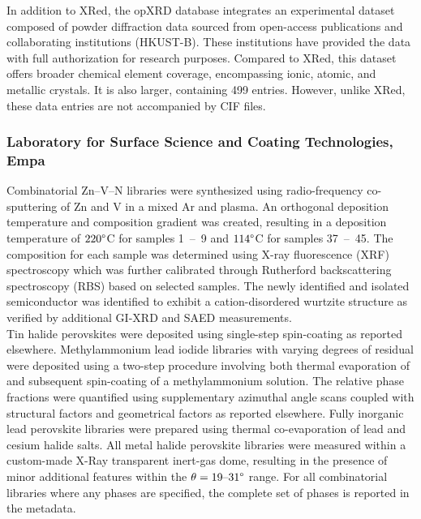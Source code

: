 In addition to XRed, the opXRD database integrates an experimental dataset composed of powder diffraction data sourced from open-access publications and collaborating institutions (HKUST-B). These institutions have provided the data with full authorization for research purposes. Compared to XRed, this dataset offers broader chemical element coverage, encompassing ionic, atomic, and metallic crystals. It is also larger, containing 499 entries. However, unlike XRed, these data entries are not accompanied by CIF files. \\


\subsubsection*{Laboratory for Surface Science and Coating Technologies, Empa}

Combinatorial Zn–V–N libraries were synthesized using radio-frequency co-sputtering of Zn and V in a mixed Ar and  plasma. An orthogonal deposition temperature and composition gradient was created, resulting in a deposition temperature of $220\degree$C for samples 1~–~9 and $114\degree$C for samples 37~–~45. The composition for each sample was determined using X-ray fluorescence (XRF) spectroscopy which was further calibrated through Rutherford backscattering spectroscopy (RBS) based on selected samples. The newly identified and isolated semiconductor  was identified to exhibit a cation-disordered wurtzite structure as verified by additional GI-XRD and SAED measurements\cite{Zhuk2021}. \\
Tin halide perovskites were deposited using single-step spin-coating as reported elsewhere\cite{Wieczorek2023}. Methylammonium lead iodide libraries with varying degrees of residual  were deposited using a two-step procedure involving both thermal evaporation of  and subsequent spin-coating of a methylammonium solution. The relative phase fractions were quantified using supplementary azimuthal angle scans coupled with structural factors and geometrical factors as reported elsewhere\cite{Wieczorek2024}. Fully inorganic lead perovskite libraries were prepared using thermal co-evaporation of lead and cesium halide salts. All metal halide perovskite libraries were measured within a custom-made X-Ray transparent inert-gas dome, resulting in the presence of minor additional features within the $\theta=19 \text{–}31\degree$ range. For all combinatorial libraries where any phases are specified, the complete set of phases is reported in the metadata. \\

